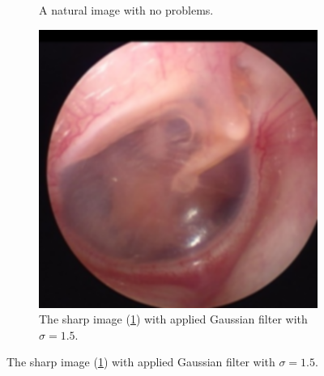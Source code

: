 \begin{figure}[H]
\begin{subfigure}[t]{0.3\textwidth}
        \caption{A natural image with no problems.}
        \label{fig:sharp}
    \end{subfigure}\hspace{1em}
    \begin{subfigure}[t]{0.3\textwidth}
        \includegraphics[width=\textwidth]{Figures/BlurredImages/Gaussian/60.png}
        \caption{The sharp image (\ref{fig:sharp}) with applied Gaussian filter with $\sigma=1.5$.}
        \label{fig:blur_synth_1.5}
    \end{subfigure}
    

\end{figure}
